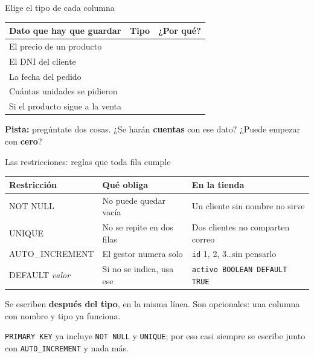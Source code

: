 \documentclass[aspectratio=169,10pt,c]{beamer}
\newcommand{\bl}[1][1.9cm]{\underline{\hspace{#1}}}
\newcommand{\ins}[1]{\tikz[baseline=-0.5ex]{\node[rounded corners=2pt,fill=utpRojo,text=white,
  font=\bfseries\scriptsize,inner xsep=5pt,inner ysep=2.5pt] {#1};}}
\begin{document}
\begin{frame}{\ins{Práctica 2} Elige el tipo de cada columna}
\begin{center}
\small
\begin{tabular}{>{\raggedright\arraybackslash}p{5.4cm}>{\raggedright\arraybackslash}p{3.0cm}>{\raggedright\arraybackslash}p{3.4cm}}
\toprule
\bfseries Dato que hay que guardar & \bfseries Tipo & \bfseries ¿Por qué? \\
\midrule
El precio de un producto & \bl[2.4cm] & \bl[2.8cm] \\[6pt]
El DNI del cliente & \bl[2.4cm] & \bl[2.8cm] \\[6pt]
La fecha del pedido & \bl[2.4cm] & \bl[2.8cm] \\[6pt]
Cuántas unidades se pidieron & \bl[2.4cm] & \bl[2.8cm] \\[6pt]
Si el producto sigue a la venta & \bl[2.4cm] & \bl[2.8cm] \\
\bottomrule
\end{tabular}
\end{center}
\vspace{0.35cm}
\small \textbf{Pista:} pregúntate dos cosas. ¿Se harán \textbf{cuentas} con ese dato? ¿Puede empezar con \textbf{cero}?
\end{frame}

\begin{frame}{Las restricciones: reglas que toda fila cumple}
\begin{center}
\small
\begin{tabular}{>{\ttfamily}p{2.9cm}>{\raggedright\arraybackslash}p{4.2cm}>{\raggedright\arraybackslash}p{4.6cm}}
\toprule
\normalfont\bfseries Restricción & \bfseries Qué obliga & \bfseries En la tienda \\
\midrule
NOT NULL & No puede quedar vacía & Un cliente sin nombre no sirve \\[5pt]
UNIQUE & No se repite en dos filas & Dos clientes no comparten correo \\[5pt]
AUTO\_INCREMENT & El gestor numera solo & \texttt{id} 1, 2, 3\ldots sin pensarlo \\[5pt]
DEFAULT \textit{valor} & Si no se indica, usa ese & \texttt{activo BOOLEAN DEFAULT TRUE} \\
\bottomrule
\end{tabular}
\end{center}
\vspace{0.4cm}
\small Se escriben \textbf{después del tipo}, en la misma línea. Son opcionales: una columna con nombre y tipo ya funciona.
\vspace{0.3cm}

\small \texttt{PRIMARY KEY} ya incluye \texttt{NOT NULL} y \texttt{UNIQUE}; por eso casi siempre se escribe junto con \texttt{AUTO\_INCREMENT} y nada más.
\end{frame}
\end{document}
